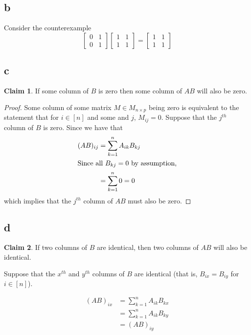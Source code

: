 \documentclass[12pt,letterpaper]{article}
\theoremstyle{definition}
\newtheorem*{claim}{Claim}
\begin{document}
\subsection*{b}

Consider the counterexample
\[
  \begin{bmatrix}
    0 & 1 \\
    0 & 1
  \end{bmatrix}
  \begin{bmatrix}
    1 & 1 \\
    1 & 1
  \end{bmatrix}
  =
  \begin{bmatrix}
    1 & 1 \\
    1 & 1
  \end{bmatrix}
\]

\subsection*{c}

\begin{claim}
  If some column of $B$ is zero then some column of $AB$ will also be zero.
\end{claim}

\begin{proof}
  Some column of some matrix $M \in M_{n \times p}$ being zero is equivalent to the statement that
  for $i \in [n]$ and some and $j$, $M_{ij} = 0$. Suppose that the $j^{th}$ column of $B$ is zero.
  Since we have that
  \begin{align*}
    (AB)_{ij} &= \sum_{k=1}^nA_{ik}B_{kj} \\
    \intertext{Since all $B_{kj} = 0$ by assumption,}
              &= \sum_{k=1}^n0 = 0
  \end{align*}
  which implies that the $j^{th}$ column of $AB$ must also be zero.
\end{proof}

\subsection*{d}

\begin{claim}
  If two columns of $B$ are identical, then two columns of $AB$ will also be identical.
\end{claim}

Suppose that the $x^{th}$ and $y^{th}$ columns of $B$ are identical (that is,
$B_{ix} =B_{iy}$ for $i \in [n]$).

\begin{align*}
  (AB)_{ix} &= \sum_{k=1}^nA_{ik}B_{kx} \\
            &= \sum_{k=1}^nA_{ik}B_{ky} \\
            &= (AB)_{iy}
\end{align*}
\end{document}
